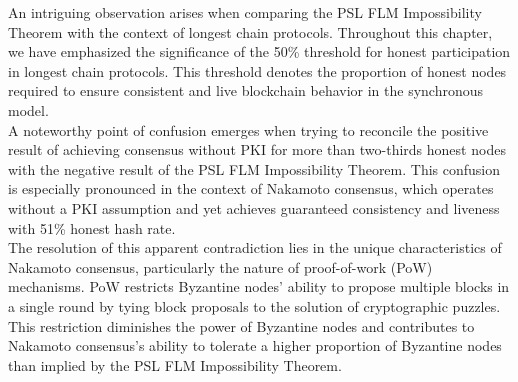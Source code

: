 An intriguing observation arises when comparing the PSL FLM Impossibility Theorem with the context of longest chain protocols. Throughout this chapter, we have emphasized the significance of the 50\% threshold for honest participation in longest chain protocols. This threshold denotes the proportion of honest nodes required to ensure consistent and live blockchain behavior in the synchronous model.\\
A noteworthy point of confusion emerges when trying to reconcile the positive result of achieving consensus without PKI for more than two-thirds honest nodes with the negative result of the PSL FLM Impossibility Theorem. This confusion is especially pronounced in the context of Nakamoto consensus, which operates without a PKI assumption and yet achieves guaranteed consistency and liveness with 51\% honest hash rate.\\
The resolution of this apparent contradiction lies in the unique characteristics of Nakamoto consensus, particularly the nature of proof-of-work (PoW) mechanisms. PoW restricts Byzantine nodes' ability to propose multiple blocks in a single round by tying block proposals to the solution of cryptographic puzzles. This restriction diminishes the power of Byzantine nodes and contributes to Nakamoto consensus's ability to tolerate a higher proportion of Byzantine nodes than implied by the PSL FLM Impossibility Theorem.


